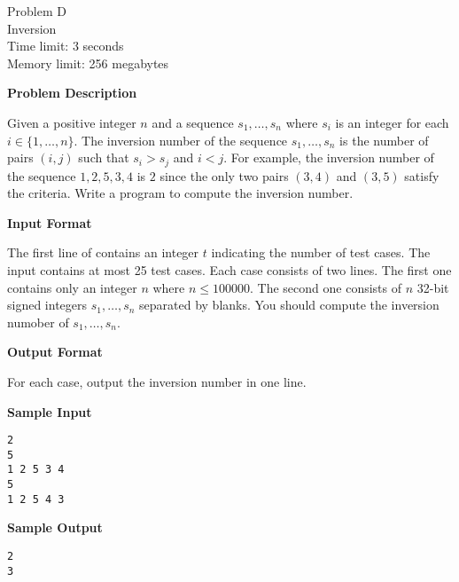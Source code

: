 \documentclass[11pt]{article}
\begin{document}
\begin{center}
    {\LARGE Problem D}\\
    {\Large Inversion}\\
    {Time limit: 3 seconds}\\
    {Memory limit: 256 megabytes}
\end{center}

\textbf{\large Problem Description}

Given a positive integer $n$ and a sequence $s_1,\dots,s_n$ where $s_i$ is an
integer for each $i\in\{1,\dots,n\}$.
The inversion number of the sequence $s_1,\dots,s_n$ is the number of pairs
$(i,j)$ such that $s_i>s_j$ and $i<j$. For example, the inversion number of
the sequence $1,2,5,3,4$ is $2$ since the only two pairs $(3,4)$ and $(3,5)$
satisfy the criteria. Write a program to compute the inversion number.

\textbf{\large Input Format}

The first line of contains an integer $t$ indicating the number of test cases.
The input contains at most 25 test cases. 
Each case consists of two lines. The first one contains only an integer $n$ where $n\le 100000$. 
The second one consists of $n$ 32-bit signed integers 
$s_1,\dots,s_n$ separated by blanks.
You should compute the inversion numober of $s_1,\dots,s_n$.

\textbf{\large Output Format}

For each case, output the inversion number in one line.

\textbf{\large Sample Input}

\begin{verbatim}
2
5
1 2 5 3 4
5
1 2 5 4 3
\end{verbatim}

\textbf{\large Sample Output}
\begin{verbatim}
2
3
\end{verbatim}
\end{document}
